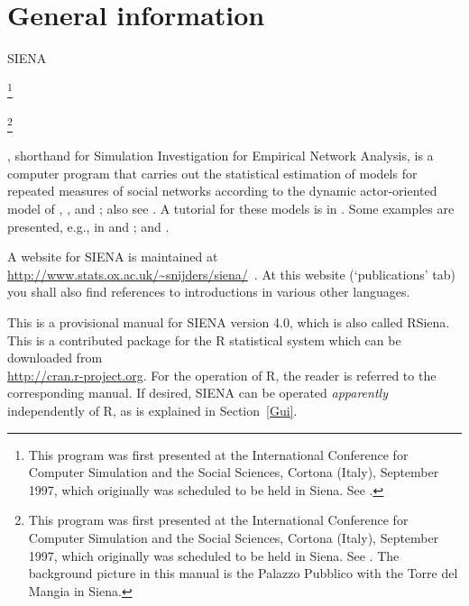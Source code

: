 \documentclass[a4paper,fleqn]{article}
\newcommand{\+}{\, + \,}
\newcommand{\R}{{\sf R }}
\newcommand{\Rn}{{\sf R}}
\newcommand{\rs}{{\sf RSiena}}
\newcommand{\SI}{{\sf SIENA }}
\newcommand{\si}{{\sf SIENA}}
\begin{document}
\begin{print}
\vfill
\newpage
\tableofcontents
\newpage
\end{print}

\begin{screen}
\vfill
\sloppy
\end{screen}


\begin{print}
\makeatletter
\def\@linkcolor{lc}
\makeatother
\end{print}

\section{General information}


\si
\begin{print}
\footnote{This program was first presented at the
International Conference for Computer Simulation and the Social
Sciences, Cortona (Italy), September 1997, which originally was
scheduled to be held in Siena. See \citet{SnijdersDuijn97}.}
\end{print}
\begin{screen}
\footnote{This program was first presented
at the International Conference for Computer Simulation and the
Social Sciences, Cortona (Italy), September 1997, which originally
was scheduled to be held in Siena. See \citet{SnijdersDuijn97} .
The background picture in this manual is the Palazzo Pubblico with
the Torre del Mangia in Siena.}
\end{screen}
$\!\!\!$, shorthand for {\sf Simulation Investigation for Empirical
Network Analysis}, is a computer program that carries out the
statistical estimation of models for repeated measures of social
networks according to the dynamic actor-oriented model of \citet{SnijdersDuijn97}, \citet{Snijders01}, and
\citet*{SnijdersEA07}; also see
\citet*{SteglichEA10}.
A tutorial for these models is in \citet*{SnijdersEA10b}.
Some examples are
presented, e.g., in \citet*{vanBunt99, vanBuntEA99} and \citet*{vanDuijnEA03};
and \citet*{SteglichEA06}.

A website for \SI is maintained at \url{http://www.stats.ox.ac.uk/~snijders/siena/}~.
At this website
(`publications' tab) you shall also find references to introductions in various other languages.


This is a provisional manual for \SI version 4.0,
which is also called \rs.
This is a contributed package for the \R statistical system
which can be downloaded from\\
\url{http://cran.r-project.org}. For the operation of \Rn,
the reader is referred
to the corresponding manual. If desired, \SI can be operated \emph{apparently}
independently of \Rn, as is explained in Section~\ref{Gui}.
\end{document}
